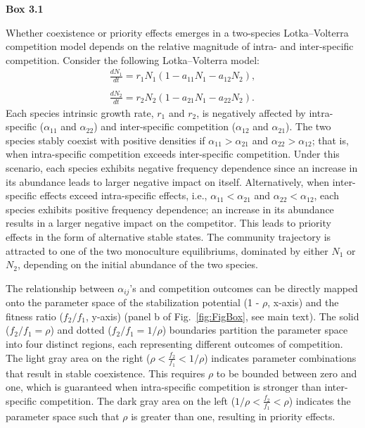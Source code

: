 \newpage
\begin{flushleft}
	\textbf{Box 3.1}
\end{flushleft}
\begin{infobox}
	
	Whether coexistence or priority effects emerges in a two-species Lotka--Volterra competition model depends on the relative magnitude of intra- and inter-specific competition. Consider the following Lotka--Volterra model:
	\begin{align*}
	\frac{dN_{1}}{dt}=r_{1}N_{1}\left ( 1-a_{11}N_{1}-a_{12}N_{2} \right ), \tag{3.5}\label{eq:LV1}
	\\~\\
	\frac{dN_{2}}{dt}=r_{2}N_{2}\left ( 1-a_{21}N_{1}-a_{22}N_{2} \right ). \tag{3.6}\label{eq:LV2}
	\end{align*}
	Each species intrinsic growth rate, $r_{1}$ and $r_{2}$, is negatively affected by intra-specific ($\alpha_{11}$ and $\alpha_{22}$) and inter-specific competition ($\alpha_{12}$ and $\alpha_{21}$). The two species stably coexist with positive densities if $\alpha_{11} > \alpha_{21}$ and $\alpha_{22} > \alpha_{12}$; that is, when intra-specific competition exceeds inter-specific competition. Under this scenario, each species exhibits negative frequency dependence since an increase in its abundance leads to larger negative impact on itself. Alternatively, when inter-specific effects exceed intra-specific effects, i.e., $\alpha_{11} < \alpha_{21}$ and $\alpha_{22} < \alpha_{12}$, each species exhibits positive frequency dependence; an increase in its abundance results in a larger negative impact on the competitor. This leads to priority effects in the form of alternative stable states. The community trajectory is attracted to one of the two monoculture equilibriums, dominated by either $N_{1}$ or $N_{2}$, depending on the initial abundance of the two species.
	\par
	
	
	The relationship between $\alpha_{ij}$'s and competition outcomes can be directly mapped onto the parameter space of the stabilization potential (1 - $\rho$, x-axis) and the fitness ratio ($f_{2}/f_{1}$, y-axis) (panel b of Fig.~\ref{fig:FigBox}, see main text). The solid ($f_{2}/f_{1} = \rho$) and dotted ($f_{2}/f_{1} = 1/\rho$) boundaries partition the parameter space into four distinct regions, each representing different outcomes of competition. The light gray area on the right ($\rho < \frac{f_{2}}{f_{1}} < 1/\rho$) indicates parameter combinations that result in stable coexistence. This requires $\rho$ to be bounded between zero and one, which is guaranteed when intra-specific competition is stronger than inter-specific competition. The dark gray area on the left ($1/\rho < \frac{f_{2}}{f_{1}} < \rho$) indicates the parameter space such that $\rho$ is greater than one, resulting in priority effects. 
\end{infobox}
